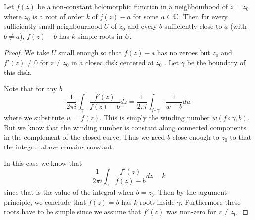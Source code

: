 \begin{theorem}
Let $f(z)$ be a non-constant holomorphic function in a neighbourhood of $z = z_0$ where $z_0$ is a root of order $k$ of $f(z) - a$ for some $a \in \mathbb{C}$. Then for every sufficiently small neighbourhood $U$ of $z_0$ and every $b$ sufficiently close to $a$ (with $b \neq a$), $f(z) - b$ has $k$ simple roots in $U$.
\end{theorem}
\begin{proof}
We take $U$ small enough so that $f(z) - a$ has no zeroes but $z_0$ and $f'(z) \neq 0$ for $z \neq z_0$ in a closed disk centered at $z_0$ . Let $\gamma$ be the boundary of this disk. 

Note that for any $b$
$$ \frac{1}{2\pi i} \int_{\gamma} \frac{f'(z)}{f(z) - b}dz = \frac{1}{2\pi i} \int_{f \circ \gamma} \frac{1}{w - b} dw $$
where we substitute $w = f(z)$. This is simply the winding number $w(f \circ \gamma, b)$. But we know that the winding number is constant along connected components in the complement of the closed curve. Thus we need $b$ close enough to $z_0$ to that the integral above remains constant.

In this case we know that 
$$ \frac{1}{2\pi i} \int_{\gamma} \frac{f'(z)}{f(z) - b} dz = k $$
since that is the value of the integral when $b = z_0$. Then by the argument principle, we conclude that $f(z) = b$ has $k$ roots inside $\gamma$. Furthermore these roots have to be simple since we assume that $f'(z)$ was non-zero for $z \neq z_0$.
\end{proof}

